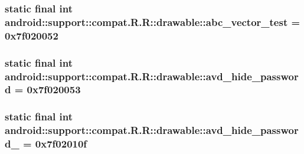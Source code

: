 \hypertarget{classandroid_1_1support_1_1compat_1_1_r_1_1drawable_82c5ef654a77f629674fed3c1f868555}{
\subsubsection[{abc\_\-vector\_\-test}]{\setlength{\rightskip}{0pt plus 5cm}static final int android::support::compat.R.R::drawable::abc\_\-vector\_\-test = 0x7f020052}}
\label{classandroid_1_1support_1_1compat_1_1_r_1_1drawable_82c5ef654a77f629674fed3c1f868555}


\hypertarget{classandroid_1_1support_1_1compat_1_1_r_1_1drawable_6c399aa06a77ba6091623bc8f104df0b}{
\subsubsection[{avd\_\-hide\_\-password}]{\setlength{\rightskip}{0pt plus 5cm}static final int android::support::compat.R.R::drawable::avd\_\-hide\_\-password = 0x7f020053}}
\label{classandroid_1_1support_1_1compat_1_1_r_1_1drawable_6c399aa06a77ba6091623bc8f104df0b}


\hypertarget{classandroid_1_1support_1_1compat_1_1_r_1_1drawable_dac115c9c63188b0a78b3de1c2565b68}{
\subsubsection[{avd\_\-hide\_\-password\_\-1}]{\setlength{\rightskip}{0pt plus 5cm}static final int android::support::compat.R.R::drawable::avd\_\-hide\_\-password\_ = 0x7f02010f}}
\label{classandroid_1_1support_1_1compat_1_1_r_1_1drawable_dac115c9c63188b0a78b3de1c2565b68}


